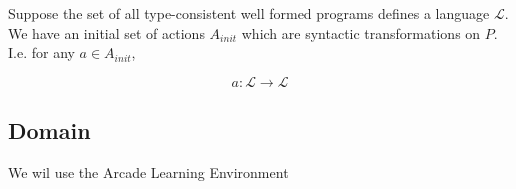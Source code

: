 \documentclass{tlp}
\begin{document}
Suppose the set of all type-consistent well formed programs defines a language $\mathcal{L}$.
We have an initial set of actions $A_{init}$ which are syntactic transformations on $P$. I.e. for any $a \in A_{init}$,

\[
a: \mathcal{L} \to \mathcal{L}
\]




\subsection{Domain}
We wil use the Arcade Learning Environment


\end{document}
